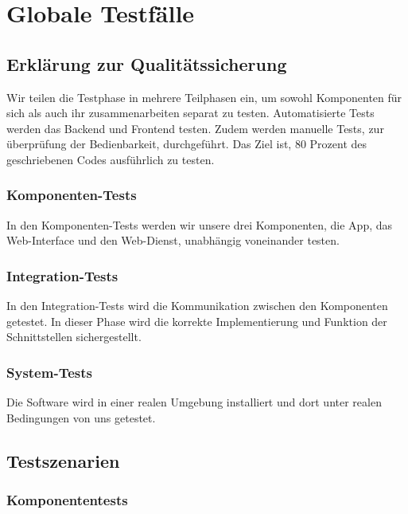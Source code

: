 \chapter{Globale Testf\"alle}
\section{Erkl\"arung zur Qualit\"atssicherung}
Wir teilen die Testphase in mehrere Teilphasen ein, um sowohl Komponenten für sich als auch ihr zusammenarbeiten separat zu testen. Automatisierte Tests werden das Backend und Frontend testen. Zudem werden manuelle Tests, zur überpr\"ufung der Bedienbarkeit, durchgef\"uhrt.  Das Ziel ist, 80 Prozent des geschriebenen Codes ausf\"uhrlich zu testen.

\subsection{Komponenten-Tests}
In den Komponenten-Tests werden wir unsere drei Komponenten, die \gls{App}, das \gls{Web-Interface} und den \gls{Web-Dienst}, unabhängig voneinander testen.

\subsection{Integration-Tests}
In den Integration-Tests wird die Kommunikation zwischen den Komponenten getestet. In dieser Phase wird die korrekte Implementierung und Funktion der Schnittstellen sichergestellt.

\subsection{System-Tests}
Die Software wird in einer realen Umgebung installiert und dort unter realen Bedingungen von uns getestet.

\section{Testszenarien}
\subsection{Komponententests}


